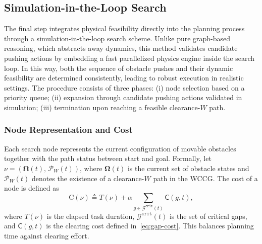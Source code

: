 \subsection{Simulation-in-the-Loop Search}
\label{subsec:simloop}

The final step integrates physical feasibility directly into the planning
process through a simulation-in-the-loop search scheme. Unlike pure
graph-based reasoning, which abstracts away dynamics, this method validates
candidate pushing actions by embedding a fast parallelized physics engine
inside the search loop. In this way, both the sequence of obstacle pushes
and their dynamic feasibility are determined consistently, leading to robust
execution in realistic settings. The procedure consists of three phases:
(i) node selection based on a priority queue;
(ii) expansion through candidate pushing actions validated in simulation;
(iii) termination upon reaching a feasible clearance-$W$ path.

\subsubsection{Node Representation and Cost}
\label{subsubsec:simloop-node}
Each search node represents the current configuration of movable obstacles
together with the path status between start and goal. Formally, let
$\nu=(\boldsymbol{\Omega}(t),\,\mathcal{P}_W(t))$, where
$\boldsymbol{\Omega}(t)$ is the current set of obstacle states and
$\mathcal{P}_W(t)$ denotes the existence of a clearance-$W$ path in the
WCCG. The cost of a node is defined as
\begin{equation}\label{eq:simloop-cost}
  \mathrm{C}(\nu)\triangleq T(\nu)+\alpha
  \sum_{g\in\mathcal{G}^{\texttt{crit}}(t)} \mathsf{C}(g,t),
\end{equation}
where $T(\nu)$ is the elapsed task duration,
$\mathcal{G}^{\texttt{crit}}(t)$ is the set of critical gaps, and
$\mathsf{C}(g,t)$ is the clearing cost defined in~\eqref{eq:gap-cost}.
This balances planning time against clearing effort.

